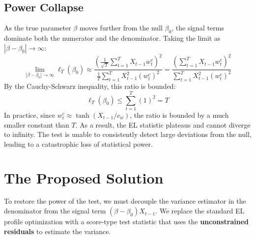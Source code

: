 \documentclass[12pt]{article}
\begin{document}
\subsection{Power Collapse}
As the true parameter $\beta$ moves further from the null $\beta_0$, the signal terms dominate both the numerator and the denominator. Taking the limit as $|\beta - \beta_0| \to \infty$:
\begin{equation}
    \lim_{|\beta - \beta_0| \to \infty} \ell_T(\beta_0) \approx \frac{\left( \frac{1}{\sqrt{T}} \sum_{t=1}^T X_{t-1} w^c_t \right)^2}{\frac{1}{T} \sum_{t=1}^T X_{t-1}^2 (w^c_t)^2} = \frac{\left( \sum_{t=1}^T X_{t-1} w^c_t \right)^2}{\sum_{t=1}^T X_{t-1}^2 (w^c_t)^2}
\end{equation}
By the Cauchy-Schwarz inequality, this ratio is bounded:
\begin{equation}
    \ell_T(\beta_0) \le \sum_{t=1}^T (1)^2 = T
\end{equation}
In practice, since $w^c_t \approx \tanh(X_{t-1}/c_w)$, the ratio is bounded by a much smaller constant than $T$. As a result, the EL statistic plateaus and cannot diverge to infinity. The test is unable to consistently detect large deviations from the null, leading to a catastrophic loss of statistical power.

\section{The Proposed Solution}

To restore the power of the test, we must decouple the variance estimator in the denominator from the signal term $(\beta - \beta_0) X_{t-1}$. We replace the standard EL profile optimization with a score-type test statistic that uses the \textbf{unconstrained residuals} to estimate the variance.
\end{document}
